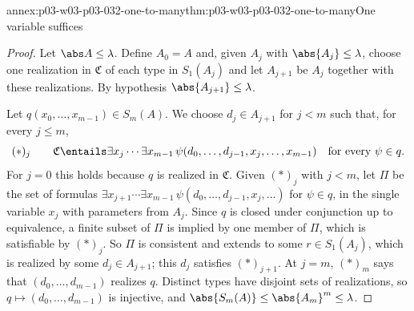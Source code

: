 \begin{annexitem}{annex:p03-w03-p03-032-one-to-many}{thm:p03-w03-p03-032-one-to-many}{One variable suffices}
\begin{proof}
Let \(\abs A\leq\lambda\).  Define \(A_0=A\) and, given \(A_j\) with
\(\abs{A_j}\leq\lambda\), choose one realization in \(\mathfrak C\) of each
type in \(S_1(A_j)\) and let \(A_{j+1}\) be \(A_j\) together with these
realizations.  By hypothesis \(\abs{A_{j+1}}\leq\lambda\).

Let \(q(x_0,\ldots,x_{m-1})\in S_m(A)\).  We choose \(d_j\in A_{j+1}\) for
\(j<m\) such that, for every \(j\leq m\),
\begin{equation*}
  (\ast)_j\qquad \mathfrak C\entails
  \exists x_j\cdots\exists x_{m-1}\,
  \psi(d_0,\ldots,d_{j-1},x_j,\ldots,x_{m-1})
  \quad\text{for every }\psi\in q .
\end{equation*}
For \(j=0\) this holds because \(q\) is realized in \(\mathfrak C\).  Given
\((\ast)_j\) with \(j<m\), let \(\Pi\) be the set of formulas
\(\exists x_{j+1}\cdots\exists x_{m-1}\,\psi(d_0,\ldots,d_{j-1},x_j,\ldots)\)
for \(\psi\in q\), in the single variable \(x_j\) with parameters from
\(A_j\).  Since \(q\) is closed under conjunction up to equivalence, a finite
subset of \(\Pi\) is implied by one member of \(\Pi\), which is satisfiable
by \((\ast)_j\).  So \(\Pi\) is consistent and extends to some
\(r\in S_1(A_j)\), which is realized by some \(d_j\in A_{j+1}\); this
\(d_j\) satisfies \((\ast)_{j+1}\).  At \(j=m\), \((\ast)_m\) says that
\((d_0,\ldots,d_{m-1})\) realizes \(q\).  Distinct types have disjoint sets
of realizations, so \(q\mapsto(d_0,\ldots,d_{m-1})\) is injective, and
\(\abs{S_m(A)}\leq\abs{A_m}^m\leq\lambda\).
\end{proof}
\end{annexitem}

